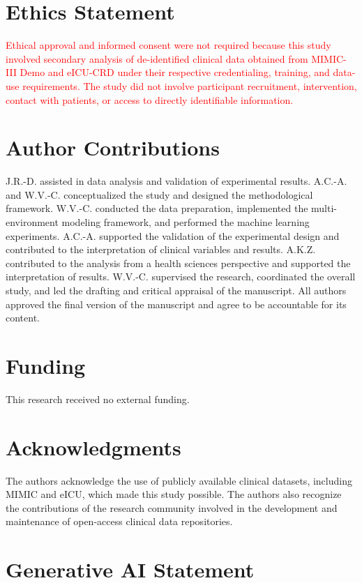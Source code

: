 \documentclass[utf8]{FrontiersinHarvard} %
\begin{document}
\section*{Ethics Statement}

\textcolor{red}{Ethical approval and informed consent were not required because this study involved secondary analysis of de-identified clinical data obtained from MIMIC-III Demo and eICU-CRD under their respective credentialing, training, and data-use requirements. The study did not involve participant recruitment, intervention, contact with patients, or access to directly identifiable information.}

\section*{Author Contributions}

J.R.-D. assisted in data analysis and validation of experimental results. A.C.-A. and W.V.-C. conceptualized the study and designed the methodological framework. W.V.-C. conducted the data preparation, implemented the multi-environment modeling framework, and performed the machine learning experiments. A.C.-A. supported the validation of the experimental design and contributed to the interpretation of clinical variables and results. A.K.Z. contributed to the analysis from a health sciences perspective and supported the interpretation of results. W.V.-C. supervised the research, coordinated the overall study, and led the drafting and critical appraisal of the manuscript. All authors approved the final version of the manuscript and agree to be accountable for its content.

\section*{Funding}

This research received no external funding.

\section*{Acknowledgments}

The authors acknowledge the use of publicly available clinical datasets, including MIMIC and eICU, which made this study possible. The authors also recognize the contributions of the research community involved in the development and maintenance of open-access clinical data repositories.

\section*{Generative AI Statement}
\end{document}
